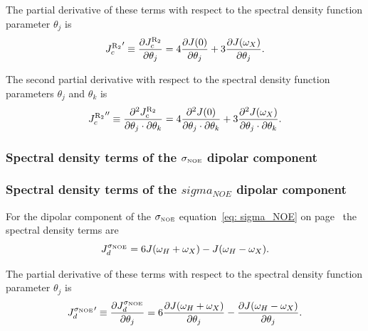 \noindent The partial derivative of these terms with respect to the spectral density function parameter $\theta_j$ is
\begin{equation}
    {J_c^{\mathrm{R}_2}}' \equiv \frac{\partial J_c^{\mathrm{R}_2}}{\partial \theta_j}
        = 4 \frac{\partial J(0)}{\partial \theta_j}
        + 3 \frac{\partial J(\omega_X)}{\partial \theta_j}.  \label{eq: J terms: JR2c'}
\end{equation}

\noindent The second partial derivative with respect to the spectral density function parameters $\theta_j$ and $\theta_k$ is
\begin{equation}
    {J_c^{\mathrm{R}_2}}'' \equiv \frac{\partial^2 J_c^{\mathrm{R}_2}}{\partial \theta_j \cdot \partial \theta_k}
        = 4 \frac{\partial^2 J(0)}{\partial \theta_j \cdot \partial \theta_k}
        + 3 \frac{\partial^2 J(\omega_X)}{\partial \theta_j \cdot \partial \theta_k}.  \label{eq: J terms: JR2c"}
\end{equation}


\begin{latexonly}
    \subsubsection{Spectral density terms of the $\sigma_{\scriptscriptstyle \mathrm{NOE}}$ dipolar component}
\end{latexonly}
\begin{htmlonly}
    \subsubsection{Spectral density terms of the $sigma_{NOE}$ dipolar component}
\end{htmlonly}

For the dipolar component of the $\sigma_{\scriptscriptstyle \mathrm{NOE}}$ equation~\eqref{eq: sigma_NOE} on page~\pageref{eq: sigma_NOE} the spectral density terms are
\begin{equation}
    J_d^{\sigma_{\scriptscriptstyle \mathrm{NOE}}} = 6J(\omega_H + \omega_X) - J(\omega_H - \omega_X).  \label{eq: J terms: JsigmaNOEd}
\end{equation}

\noindent The partial derivative of these terms with respect to the spectral density function parameter $\theta_j$ is
\begin{equation}
    {J_d^{\sigma_{\scriptscriptstyle \mathrm{NOE}}}}' \equiv \frac{\partial J_d^{\sigma_{\scriptscriptstyle \mathrm{NOE}}}}{\partial \theta_j}
        = 6 \frac{\partial J(\omega_H + \omega_X)}{\partial \theta_j}
          - \frac{\partial J(\omega_H - \omega_X)}{\partial \theta_j}.  \label{eq: J terms: JsigmaNOEd'}
\end{equation}

